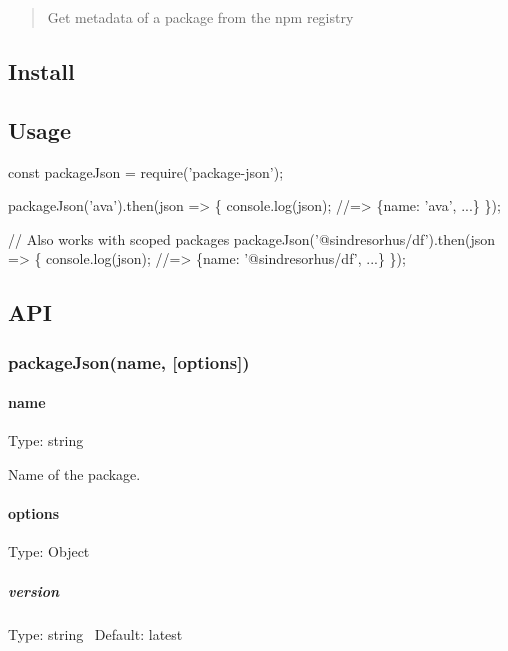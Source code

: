\begin{quote}
Get metadata of a package from the npm registry \end{quote}


\subsection*{Install}




\subsection*{Usage}


\begin{DoxyCode}
const packageJson = require('package-json');

packageJson('ava').then(json => \{
  console.log(json);
  //=> \{name: 'ava', ...\}
\});

// Also works with scoped packages
packageJson('@sindresorhus/df').then(json => \{
  console.log(json);
  //=> \{name: '@sindresorhus/df', ...\}
\});
\end{DoxyCode}


\subsection*{A\+PI}

\subsubsection*{package\+Json(name, \mbox{[}options\mbox{]})}

\paragraph*{name}

Type\+: {\ttfamily string}

Name of the package.

\paragraph*{options}

Type\+: {\ttfamily Object}

\subparagraph*{version}

Type\+: {\ttfamily string}~\newline
 Default\+: {\ttfamily latest}

